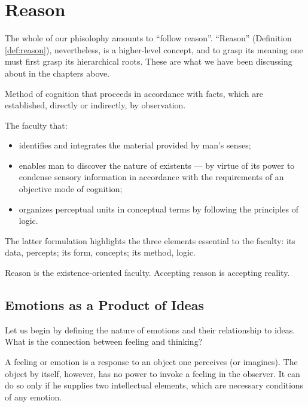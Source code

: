 \chapter{Reason}

    The whole of our phisolophy amounts to ``follow reason''. ``Reason'' (Definition \ref{def:reason}), nevertheless, is a higher-level concept, and to grasp its meaning one must first grasp its hierarchical roots. These are what we have been discussing about in the chapters above.

        \begin{definition}[Reason]
        \label{def:reason}
            Method of cognition that proceeds in accordance with facts, which are established, directly or indirectly, by observation.
            
            The faculty that:
            \begin{itemize}
                \item identifies and integrates the material provided by man's senses;
                \item enables man to discover the nature of existents — by virtue of its power to condense sensory information in accordance with the requirements of an objective mode of cognition;
                \item organizes perceptual units in conceptual terms by following the principles of logic.
            \end{itemize}
        \end{definition}

        \begin{remark}
            The latter formulation highlights the three elements essential to the faculty: its data, percepts; its form, concepts; its method, logic.
        \end{remark}

    Reason is the existence-oriented faculty. Accepting reason is accepting reality.

    \section{Emotions as a Product of Ideas}
    
        Let us begin by defining the nature of emotions and their relationship to ideas. What is the connection between feeling and thinking?
        
        A feeling or emotion is a response to an object one perceives (or imagines). The object by itself, however, has no power to invoke a feeling in the observer. It can do so only if he supplies two intellectual elements, which are necessary conditions of any emotion.
        
